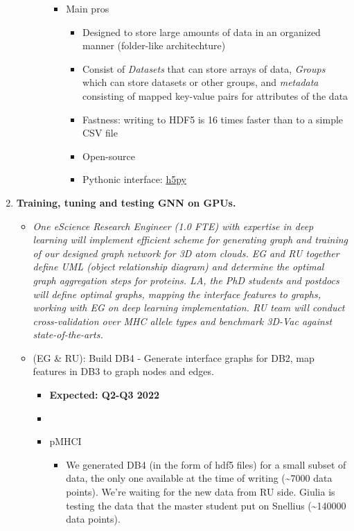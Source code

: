 \begin{enumerate}[start=0,label={\bfseries \ding{118} Task \arabic*:}]
\begin{itemize}[label=]
\begin{itemize}
\begin{itemize}
\item Main pros
\begin{itemize}
  \item Designed to store large amounts of data in an organized manner (folder-like architechture)
  \item Consist of \textit{Datasets} that can store arrays of data, \textit{Groups} which can store datasets or other groups,
and \textit{metadata} consisting of mapped key-value pairs for attributes of the data 
  \item Fastness: writing to HDF5 is 16 times faster than to a simple CSV file
  \item Open-source
  \item Pythonic interface: \href{https://docs.h5py.org/en/latest/index.html}{h5py}
\end{itemize}
\end{itemize}
\end{itemize}
\end{itemize}
\item \textbf{Training, tuning and testing GNN on GPUs.}
\begin{itemize}%
\item \textit{One eScience Research Engineer (1.0 FTE) with expertise in deep learning will implement efficient scheme for
generating graph and training of our designed graph network for 3D atom clouds. EG and RU together define UML (object
relationship diagram) and determine the optimal graph aggregation steps for proteins. LA, the PhD students and postdocs
will define optimal graphs, mapping the interface features to graphs, working with EG on deep learning implementation.
RU team will conduct cross-validation over MHC allele types and benchmark 3D-Vac against state-of-the-arts.}
\item (EG \& RU): Build DB4 - Generate interface graphs for DB2, map features in DB3 to graph nodes and edges.
\begin{itemize}
\item \textbf{Expected: Q2-Q3 2022}
\item {}
\item pMHCI
\begin{itemize}
\item We generated DB4 (in the form of hdf5 files) for a small subset of data, the only one available at the time of writing
(\~{}7000 data points). We're waiting for the new data from RU side.
Giulia is testing the data that the master student put on Snellius (\~{}140000 data points).

\end{itemize}
\end{itemize}
\end{itemize}
\end{enumerate}

